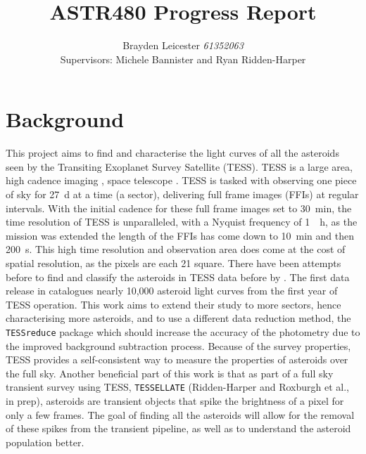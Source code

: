 \documentclass[12pt]{article}
\title{ASTR480 Progress Report}
\author{Brayden Leicester \textit{61352063} \\[1ex]
\small{Supervisors: Michele Bannister and Ryan Ridden-Harper}
}
\begin{document}
\maketitle


\section{Background}

This project aims to find and characterise the light curves of all the asteroids seen by the Transiting Exoplanet Survey Satellite (TESS). 
TESS is a large area, high cadence imaging , space telescope  \citep{Ricker2014}. 
TESS is tasked with observing one piece of sky for \qty{27}{\day} at a time (a sector), delivering  full frame images (FFIs) at regular intervals. 
With the initial cadence for these full frame images set to \qty{30}{\minute}, the time resolution of TESS is unparalleled, with a Nyquist frequency of \qty{1}{\per\hour}, as the mission was extended the length of the FFIs has come down to \qty{10}{\minute} and then \qty{200}{\second}. 
This high time resolution and observation area does come at the cost of spatial resolution, as the pixels are each \qty{21}{\arcsec} square.
There have been attempts before to find and classify the asteroids in TESS data before by \citet{Pal2018, Pal2020}. 
The first data release in \citet{Pal2020} catalogues nearly 10,000 asteroid light curves from the first year of TESS operation.
This work aims to extend their study to more sectors, hence characterising more asteroids, and to use a different data reduction method, the \texttt{TESSreduce} package \citep{Ridden-Harper2021} which should increase the accuracy of the photometry due to the improved background subtraction process.
Because of the survey properties, TESS provides a self-consistent way to measure the properties of asteroids over the full sky.   
Another beneficial part of this work is that as part of a full sky transient survey using TESS, \texttt{TESSELLATE} (Ridden-Harper and Roxburgh et al., in prep), asteroids are transient objects that spike the brightness of a pixel for only a few frames.
The goal of finding all the asteroids will allow for the removal of these spikes from the transient pipeline, as well as to understand the asteroid population better.  
\end{document}
